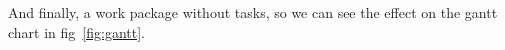 \begin{workplan}
\begin{workpackage}[id=workphase,title=A work package without tasks,
  wphases=0-4!.5]
  
  And finally, a work package without tasks, so we can see the effect on the gantt chart
  in fig~\ref{fig:gantt}.
\end{workpackage}
\end{workplan} 

\ganttchart[draft,xscale=.45]



